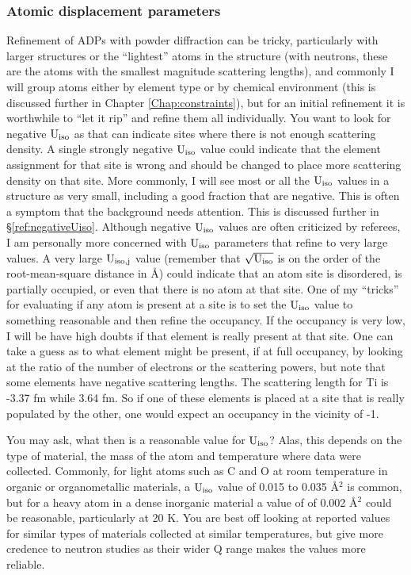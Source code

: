 \subsubsection{Atomic displacement parameters}
Refinement of ADPs with powder diffraction can be tricky, particularly with larger structures or the ``lightest'' atoms in the structure (with neutrons, these are the atoms with the smallest magnitude scattering lengths), and commonly I will group atoms either by element type or by chemical environment (this is discussed further in Chapter \ref{Chap:constraints}), but for an initial refinement it is worthwhile to ``let it rip'' and refine them all individually. You want to look for negative $\rm U_{iso}$ as that can indicate sites where there is not enough scattering density. A single strongly negative $\rm U_{iso}$ value could indicate that the element assignment for that site is wrong and should be changed to place more scattering density on that site. More commonly, I will see most or all the $\rm U_{iso}$ values in a structure as very small, including a good fraction that are negative. This is often a symptom that the background needs attention. This is discussed further in \S\ref{ref:negativeUiso}. Although negative $\rm U_{iso}$ values are often criticized by referees, I am personally more concerned with $\rm U_{iso}$ parameters that refine to very large values. A very large $\rm U_{iso,j}$ value (remember that $\sqrt{\rm U_{iso}}$ is on the order of the root-mean-square distance in Å) could indicate that an atom site is disordered, is partially occupied, or even that there is no atom at that site. One of my ``tricks'' for evaluating if any atom is present at a site is to set the $\rm U_{iso}$ value to something reasonable and then refine the occupancy. If the occupancy is very low, I will be have high doubts if that element is really present at that site. One can take a guess as to what element might be present, if at full occupancy, by looking at the ratio of the number of electrons or the scattering powers, but note that some elements have negative scattering lengths. The scattering length for Ti is -3.37 fm while 3.64 fm. So if one of these elements is placed at a site that is really populated by the other, one would expect an occupancy in the vicinity of -1. 

You may ask, what then is a reasonable value for $\rm U_{iso}$? Alas, this depends on the type of material, the mass of the atom and temperature where data were collected. Commonly, for light atoms such as C and O at room temperature in organic or organometallic materials, a $\rm U_{iso}$ value of 0.015 to 0.035 Å${}^2$ is common, but for a heavy atom in a dense inorganic material a value of of 0.002 Å${}^2$ could be reasonable, particularly at 20 K. You are best off looking at reported values for similar types of materials collected at similar temperatures, but give more credence to neutron studies as their wider Q range makes the values more reliable. 

